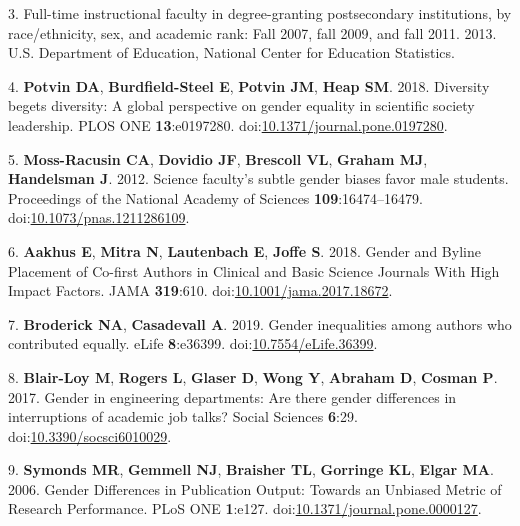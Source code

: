 \documentclass[11pt,]{article}
\begin{document}
\hypertarget{ref-NCES_full-time_2011}{}
3. Full-time instructional faculty in degree-granting postsecondary
institutions, by race/ethnicity, sex, and academic rank: Fall 2007, fall
2009, and fall 2011. 2013. U.S. Department of Education, National Center
for Education Statistics.

\hypertarget{ref-potvin_diversity_2018}{}
4. \textbf{Potvin DA}, \textbf{Burdfield-Steel E}, \textbf{Potvin JM},
\textbf{Heap SM}. 2018. Diversity begets diversity: A global perspective
on gender equality in scientific society leadership. PLOS ONE
\textbf{13}:e0197280.
doi:\href{https://doi.org/10.1371/journal.pone.0197280}{10.1371/journal.pone.0197280}.

\hypertarget{ref-moss-racusin_science_2012}{}
5. \textbf{Moss-Racusin CA}, \textbf{Dovidio JF}, \textbf{Brescoll VL},
\textbf{Graham MJ}, \textbf{Handelsman J}. 2012. Science faculty's
subtle gender biases favor male students. Proceedings of the National
Academy of Sciences \textbf{109}:16474--16479.
doi:\href{https://doi.org/10.1073/pnas.1211286109}{10.1073/pnas.1211286109}.

\hypertarget{ref-aakhus_gender_2018}{}
6. \textbf{Aakhus E}, \textbf{Mitra N}, \textbf{Lautenbach E},
\textbf{Joffe S}. 2018. Gender and Byline Placement of Co-first Authors
in Clinical and Basic Science Journals With High Impact Factors. JAMA
\textbf{319}:610.
doi:\href{https://doi.org/10.1001/jama.2017.18672}{10.1001/jama.2017.18672}.

\hypertarget{ref-broderick_gender_2019}{}
7. \textbf{Broderick NA}, \textbf{Casadevall A}. 2019. Gender
inequalities among authors who contributed equally. eLife
\textbf{8}:e36399.
doi:\href{https://doi.org/10.7554/eLife.36399}{10.7554/eLife.36399}.

\hypertarget{ref-BlairLoy2017}{}
8. \textbf{Blair-Loy M}, \textbf{Rogers L}, \textbf{Glaser D},
\textbf{Wong Y}, \textbf{Abraham D}, \textbf{Cosman P}. 2017. Gender in
engineering departments: Are there gender differences in interruptions
of academic job talks? Social Sciences \textbf{6}:29.
doi:\href{https://doi.org/10.3390/socsci6010029}{10.3390/socsci6010029}.

\hypertarget{ref-symonds_gender_2006}{}
9. \textbf{Symonds MR}, \textbf{Gemmell NJ}, \textbf{Braisher TL},
\textbf{Gorringe KL}, \textbf{Elgar MA}. 2006. Gender Differences in
Publication Output: Towards an Unbiased Metric of Research Performance.
PLoS ONE \textbf{1}:e127.
doi:\href{https://doi.org/10.1371/journal.pone.0000127}{10.1371/journal.pone.0000127}.
\end{document}
